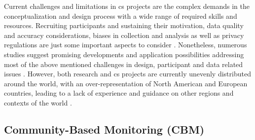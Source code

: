 Current challenges and limitations in \acrshort{cs} projects are the complex demands in the conceptualization and design process with a wide range of required skills and resources. Recruiting participants and sustaining their motivation, data quality and accuracy considerations, biases in collection and analysis as well as privacy regulations are just some important aspects to consider \autocite{fraislCitizenScienceEnvironmental2022}. Nonetheless, numerous studies suggest promising developments and application possibilities addressing most of the above mentioned challenges in design, participant and data related issues \autocite{buckinghamshumGlobalParticipatoryPlatform2012,buddeParticipatorySensingParticipatory2017,escaECSACharacteristicsCitizen2020,fraislCitizenScienceEnvironmental2022,lowryGrowingPainsCrowdsourced2019,pocockStrategicFrameworkSupport2014,ruttenHowGetKeep2017,weeserCitizenSciencePioneers2018a}. However, both research and \acrshort{cs} projects are currently unevenly distributed around the world, with an over-representation of North American and European countries, leading to a lack of experience and guidance on other regions and contexts of the world \autocite{kirschkeCitizenScienceProjects2022, zhengCrowdsourcingMethodsData2018}. 

\subsection{Community-Based Monitoring (CBM)}\label{subsec:cbm}


